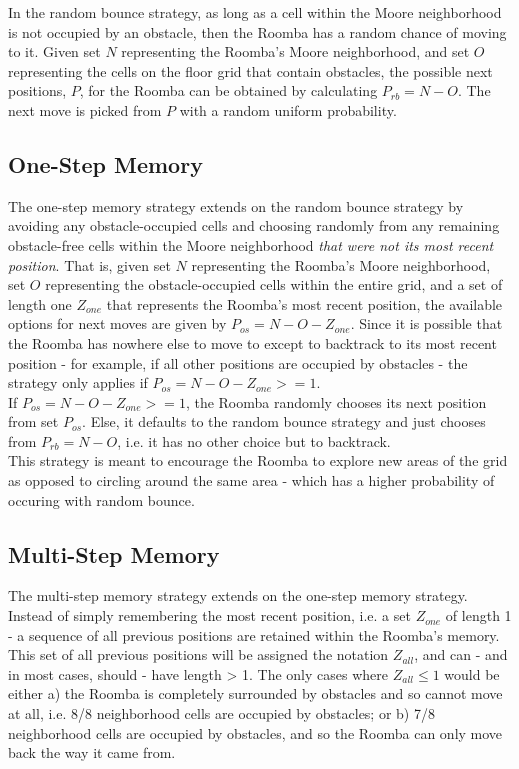 \documentclass[11pt]{article}
\begin{document}
In the random bounce strategy, as long as a cell within the Moore
neighborhood is not occupied by an obstacle, then the Roomba has a
random chance of moving to it. Given set \(N\) representing the Roomba's
Moore neighborhood, and set \(O\) representing the cells on the floor
grid that contain obstacles, the possible next positions, \(P\), for the
Roomba can be obtained by calculating \(P_{rb} = N - O\). The next move
is picked from \(P\) with a random uniform probability.

\subsection{One-Step Memory}

The one-step memory strategy extends on the random bounce strategy by
avoiding any obstacle-occupied cells and choosing randomly from any
remaining obstacle-free cells within the Moore neighborhood \emph{that
were not its most recent position}. That is, given set \(N\)
representing the Roomba's Moore neighborhood, set \(O\) representing the
obstacle-occupied cells within the entire grid, and a set of length one
\(Z_{one}\) that represents the Roomba's most recent position, the
available options for next moves are given by
\(P_{os} = N - O - Z_{one}\). Since it is possible that the Roomba has
nowhere else to move to except to backtrack to its most recent position
- for example, if all other positions are occupied by obstacles - the
strategy only applies if \(P_{os} = N - O - Z_{one} >= 1\).\\

If \(P_{os} = N - O - Z_{one} >= 1\), the Roomba randomly chooses its
next position from set \(P_{os}\). Else, it defaults to the random
bounce strategy and just chooses from \(P_{rb} = N - O\), i.e. it has no
other choice but to backtrack.\\

This strategy is meant to encourage the Roomba to explore new areas of
the grid as opposed to circling around the same area - which has a
higher probability of occuring with random bounce.

\subsection{Multi-Step Memory}

The multi-step memory strategy extends on the one-step memory strategy.
Instead of simply remembering the most recent position, i.e. a set
\(Z_{one}\) of length 1 - a sequence of all previous positions are
retained within the Roomba's memory. This set of all previous positions
will be assigned the notation \(Z_{all}\), and can - and in most cases,
should - have length \textgreater{} 1. The only cases where
\(Z_{all} \leq 1\) would be either a) the Roomba is completely
surrounded by obstacles and so cannot move at all, i.e. 8/8 neighborhood
cells are occupied by obstacles; or b) 7/8 neighborhood cells are
occupied by obstacles, and so the Roomba can only move back the way it
came from.\\
\end{document}
